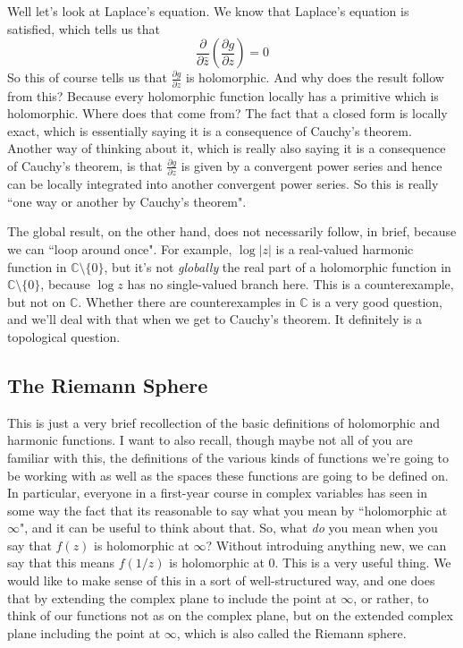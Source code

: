 \documentclass{article}
\newcommand{\mbb}[1]{\mathbb{#1}}
\newcommand{\prt}[2]{{\frac{\partial {#1}}{\partial {#2}}}}
\begin{document}
Well let's look at Laplace's equation. We know that Laplace's equation is satisfied, which tells us that
\[\prt{}{\bar{z}}\left(\prt{g}{z}\right) = 0\]
So this of course tells us that \(\prt{g}{z}\) is holomorphic. And why does the result follow from this? Because every holomorphic function locally has a primitive which is holomorphic. Where does that come from? The fact that a closed form is locally exact, which is essentially saying it is a consequence of Cauchy's theorem. Another way of thinking about it, which is really also saying it is a consequence of Cauchy's theorem, is that \(\prt{g}{z}\) is given by a convergent power series and hence can be locally integrated into another convergent power series. So this is really ``one way or another by Cauchy's theorem".

The global result, on the other hand, does not necessarily follow, in brief, because we can ``loop around once". For example, \(\log|z|\) is a real-valued harmonic function in \(\mbb{C} \setminus \{0\}\), but it's not \textit{globally} the real part of a holomorphic function in \(\mbb{C} \setminus \{0\}\), because \(\log z\) has no single-valued branch here. This is a counterexample, but not on \(\mbb{C}\). Whether there are counterexamples in \(\mbb{C}\) is a very good question, and we'll deal with that when we get to Cauchy's theorem. It definitely is a topological question.

\subsection{The Riemann Sphere}

This is just a very brief recollection of the basic definitions of holomorphic and harmonic functions. I want to also recall, though maybe not all of you are familiar with this, the definitions of the various kinds of functions we're going to be working with as well as the spaces these functions are going to be defined on. In particular, everyone in a first-year course in complex variables has seen in some way the fact that its reasonable to say what you mean by ``holomorphic at \(\infty\)", and it can be useful to think about that. So, what \textit{do} you mean when you say that \(f(z)\) is holomorphic at \(\infty\)? Without introduing anything new, we can say that this means \(f(1/z)\) is holomorphic at \(0\). This is a very useful thing. We would like to make sense of this in a sort of well-structured way, and one does that by extending the complex plane to include the point at \(\infty\), or rather, to think of our functions not as on the complex plane, but on the extended complex plane including the point at \(\infty\), which is also called the Riemann sphere.
\end{document}
